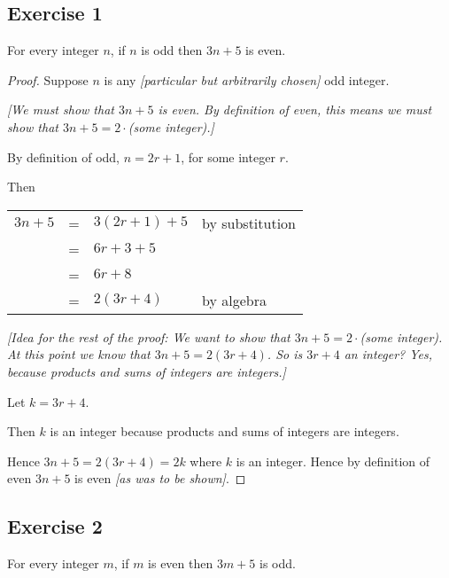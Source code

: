 \documentclass[14pt]{extarticle}
\begin{document}
\subsection{Exercise 1}
For every integer $n$, if $n$ is odd then $3n + 5$ is even.

\begin{proof}
Suppose $n$ is any {\it [particular but arbitrarily chosen]} odd integer. 

{\it [We must show that $3n + 5$ is even. By definition of even, this means we must show that $3n + 5 = 2\cdot$(some integer).]}

By definition of odd, $n = 2r + 1$, for some integer $r$. 

Then

\begin{center}
\begin{tabular}{rcll}
$3n + 5$ & = & $3(2r + 1) + 5$ & \color{cyan} by substitution \\
& = & $6r + 3 + 5$ & \\
& = & $6r + 8$ & \\
& = & $2(3r + 4)$ & \color{cyan} by algebra \\
\end{tabular}
\end{center}

{\it [Idea for the rest of the proof: We want to show that $3n + 5 = 2\cdot$(some integer). At this point we know that $3n + 5 = 2(3r + 4)$. So is $3r + 4$ an integer? Yes, because products and sums of integers are integers.]}

Let $k = 3r + 4$. 

Then $k$ is an integer because products and sums of integers are integers. 

Hence $3n + 5 = 2(3r+4) = 2k$ where $k$ is an integer. Hence by definition of even $3n+5$ is even {\it [as was to be shown]}.
\end{proof}

\subsection{Exercise 2}
For every integer $m$, if $m$ is even then $3m + 5$ is odd.
\end{document}
